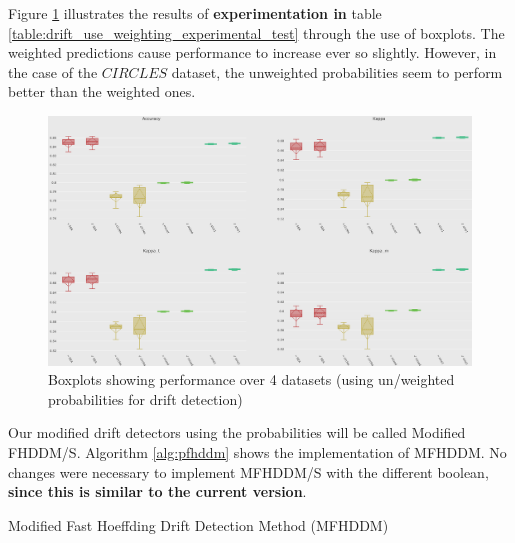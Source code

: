Figure \ref{fig:boxplot_params_use_w} illustrates the results of \textbf{experimentation in} table \ref{table:drift_use_weighting_experimental_test} through the use of boxplots. The weighted predictions cause performance to increase ever so slightly. However, in the case of the $CIRCLES$ dataset, the unweighted probabilities seem to perform better than the weighted ones.

\begin{figure}
  \includegraphics[width=\linewidth]{./images/chapter3/boxplot_params_use_w}
\caption{\label{fig:boxplot_params_use_w}Boxplots showing performance over 4 datasets (using un/weighted probabilities for drift detection)}
\end{figure}

Our modified drift detectors using the probabilities will be called Modified FHDDM/S.
Algorithm \ref{alg:pfhddm} shows the implementation of MFHDDM. No changes were necessary to implement MFHDDM/S with the different boolean, \textbf{since this is similar to the current version}.

\begin{algorithm}[h]
\caption{Modified Fast Hoeffding Drift Detection Method (MFHDDM)\label{alg:pfhddm}}


\end{algorithm}

